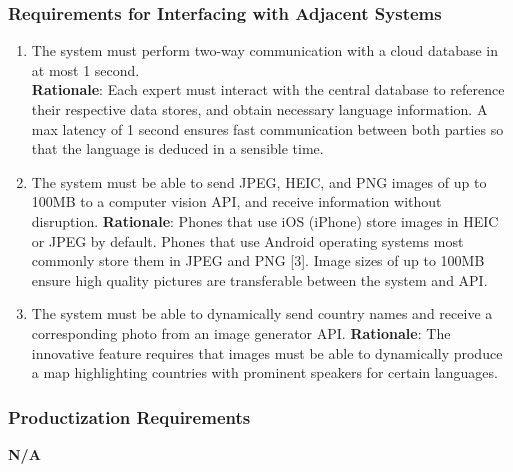\subsubsection{Requirements for Interfacing with Adjacent Systems}
\label{ssub:requirements_for_interfacing_with_adjacent_systems}
\begin{enumerate}[{OE-IA}1. ]
	\item The system must perform two-way communication with a cloud database in at most 1 second.\\  \textbf{Rationale}: Each expert must interact with the central database to reference their respective data stores, and obtain necessary language information. A max latency of 1 second ensures fast communication between both parties so that the language is deduced in a sensible time.   
	\item The system must be able to send JPEG, HEIC, and PNG images of up to 100MB to a computer vision API, and receive information without disruption.
	\textbf{Rationale}: Phones that use iOS (iPhone) store images in HEIC or JPEG by default. Phones that use Android operating systems most commonly store them in JPEG and PNG [3]. Image sizes of up to 100MB ensure high quality pictures are transferable between the system and API.
	\item The system must be able to dynamically send country names and receive a corresponding photo from an image generator API.
	\textbf{Rationale}: The innovative feature requires that images must be able to dynamically produce a map highlighting countries with prominent speakers for certain languages.
\end{enumerate}

\subsubsection{Productization Requirements}
\label{ssub:productization_requirements}
\textbf{N/A}

